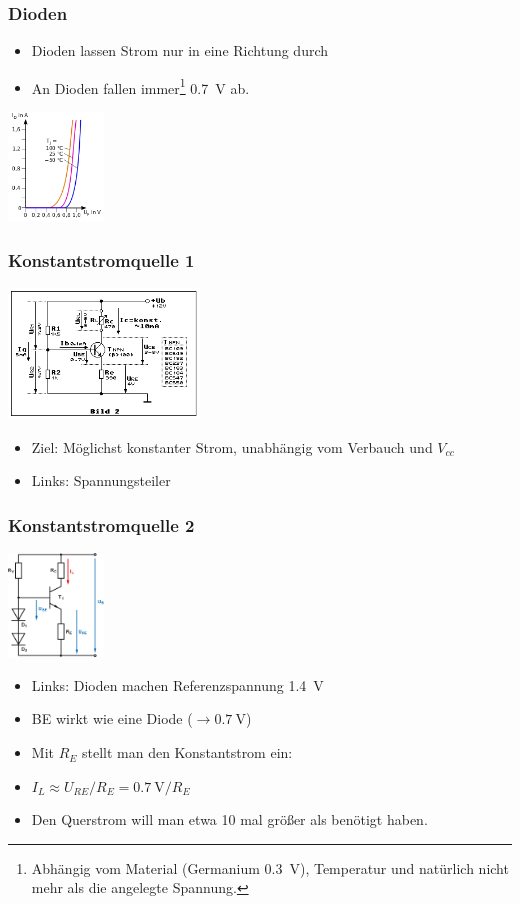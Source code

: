 \documentclass[ngerman,compress]{beamer}
\begin{document}
\begin{frame}
	\frametitle{Dioden}
	\begin{itemize}
		\item Dioden lassen Strom nur in eine Richtung durch
		\item An Dioden fallen immer\footnote{Abhängig vom Material
			(Germanium \SI{0,3}{\volt}), Temperatur und natürlich nicht mehr als die angelegte
			Spannung.} \SI{0,7}{\volt} ab.
	\end{itemize}
	\includegraphics[width=1in]{diod.png}
\end{frame}

\begin{frame}
	\frametitle{Konstantstromquelle 1}
	\includegraphics[width=2in]{konst1.png}
	\begin{itemize}
		\item Ziel: Möglichst konstanter Strom, unabhängig vom Verbauch und
			$V_{cc}$
		\item Links: Spannungsteiler
	\end{itemize}
\end{frame}

\begin{frame}
	\frametitle{Konstantstromquelle 2}
	\includegraphics[width=1in]{konst2.png}
	\begin{itemize}
		\item Links: Dioden machen Referenzspannung \SI{1,4}{\volt}
		\item BE wirkt wie eine Diode ($\rightarrow \SI{0,7}{\volt}$)
		\item Mit $R_E$ stellt man den Konstantstrom ein:
		\item $I_L \approx U_{RE} / R_E = \SI{0,7}{\volt} / R_E$
		\item Den Querstrom will man etwa 10 mal größer als benötigt haben.
	\end{itemize}
\end{frame}
\end{document}
